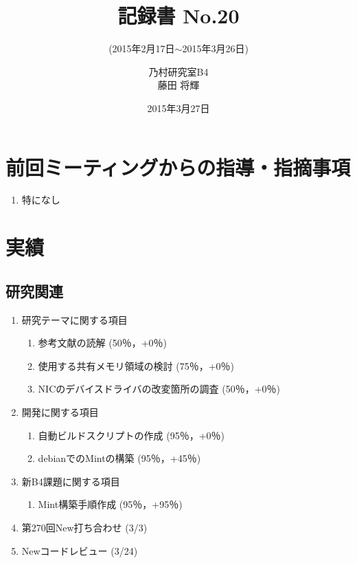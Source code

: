 \documentclass[fleqn, 14pt]{extarticle}
\subtitle{(2015年2月17日$\sim$2015年3月26日)}
\author{乃村研究室B4\\藤田 将輝}
\date{2015年3月27日}
\title{記録書 No.20}
\begin{document}
\maketitle
\section{前回ミーティングからの指導・指摘事項}
\label{sec-1}
\begin{enumerate}
\item 特になし
\newline
\hfill

\end{enumerate}




\section{実績}
\label{sec-2}

\subsection{研究関連}
\label{sec-2-1}
\begin{enumerate}
    \item 研究テーマに関する項目
    \hfill
    \label{enum-research1}
    \begin{enumerate}

        \item 参考文献の読解
        \hfill
        \label{enum-1-A}
        (50％，+0％)
        \item 使用する共有メモリ領域の検討
        \hfill
        \label{enum-1-B}
        (75％，+0％)
        \item NICのデバイスドライバの改変箇所の調査
        \hfill
        \label{enum-1-C}
        (50％，+0％)
    \end{enumerate}
    \item 開発に関する項目
    \hfill
    \label{enum-research2}
    \begin{enumerate}

        \item 自動ビルドスクリプトの作成
        \hfill
        \label{enum-2-A}
        (95％，+0％)
        \item debianでのMintの構築
        \hfill
        \label{enum-2-A}
        (95％，+45％)
    \end{enumerate}
    \item 新B4課題に関する項目
    \hfill
    \label{enum-research3}
    \begin{enumerate}
        \item Mint構築手順作成
        \hfill
        \label{enum-3-A}
        (95％，+95％)
        
    \end{enumerate}
    \item 第270回New打ち合わせ 
    \hfill
    \label{enum-research3}
    (3/3)

    \item Newコードレビュー 
    \hfill
    \label{enum-research3}
    (3/24)
    \end{enumerate}
\end{document}
